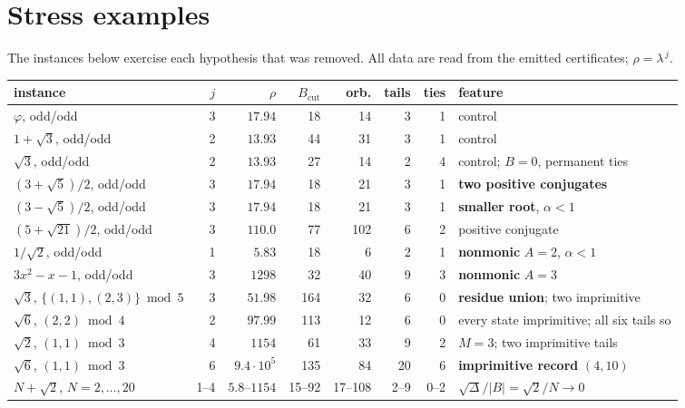 \documentclass[11pt]{article}
\theoremstyle{definition}
\theoremstyle{remark}
\begin{document}
\section{Stress examples}\label{sec:stress}

The instances below exercise each hypothesis that was removed. All data are read from the
emitted certificates; $\rho=\lambda^{\,j}$.

\begin{center}\footnotesize
\setlength{\tabcolsep}{4pt}
\begin{tabular}{@{}lrrrrrrp{3.5cm}@{}}
\toprule
instance & $j$ & $\rho$ & $B_{\mathrm{cut}}$ & orb. & tails & ties & feature \\
\midrule
$\varphi$, odd/odd & 3 & $17.94$ & 18 & 14 & 3 & 1 & control \cite{DeJesus2026oddodd} \\
$1+\sqrt3$, odd/odd & 2 & $13.93$ & 44 & 31 & 3 & 1 & control \\
$\sqrt3$, odd/odd & 2 & $13.93$ & 27 & 14 & 2 & 4 & control; $B=0$, permanent ties \\
$(3+\sqrt5)/2$, odd/odd & 3 & $17.94$ & 18 & 21 & 3 & 1 & \textbf{two positive conjugates} \\
$(3-\sqrt5)/2$, odd/odd & 3 & $17.94$ & 18 & 21 & 3 & 1 & \textbf{smaller root}, $\alpha<1$ \\
$(5+\sqrt{21})/2$, odd/odd & 3 & $110.0$ & 77 & 102 & 6 & 2 & positive conjugate \\
$1/\sqrt2$, odd/odd & 1 & $5.83$ & 18 & 6 & 2 & 1 & \textbf{nonmonic} $A=2$, $\alpha<1$ \\
$3x^2\!-\!x\!-\!1$, odd/odd & 3 & $1298$ & 32 & 40 & 9 & 3 & \textbf{nonmonic} $A=3$ \\
$\sqrt3$, $\{(1,1),(2,3)\}\bmod5$ & 3 & $51.98$ & 164 & 32 & 6 & 0 & \textbf{residue union};
  two imprimitive \\
$\sqrt6$, $(2,2)\bmod4$ & 2 & $97.99$ & 113 & 12 & 6 & 0 & every state imprimitive;
  all six tails so \\
$\sqrt2$, $(1,1)\bmod3$ & 4 & $1154$ & 61 & 33 & 9 & 2 & $M=3$; two imprimitive tails \\
$\sqrt6$, $(1,1)\bmod3$ & 6 & $9.4\cdot10^{5}$ & 135 & 84 & 20 & 6 & \textbf{imprimitive
  record} $(4,10)$ \\
$N+\sqrt2$, $N=2,\dots,20$ & 1--4 & $5.8$--$1154$ & 15--92 & 17--108 & 2--9 & 0--2 &
  $\sqrt\Delta/|B|=\sqrt2/N\to0$ \\
\bottomrule
\end{tabular}
\end{center}
\end{document}
